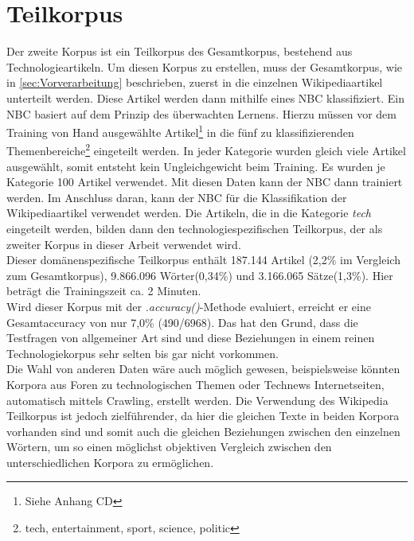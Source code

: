 \documentclass[12pt,a4paper]{report}
\begin{document}
	\section{Teilkorpus}
	\label{sec:Teilkorpus}	
	Der zweite Korpus ist ein Teilkorpus des Gesamtkorpus, bestehend aus Technologieartikeln. Um diesen Korpus zu erstellen, muss der Gesamtkorpus, wie in \ref{sec:Vorverarbeitung} beschrieben, zuerst in die einzelnen Wikipediaartikel unterteilt werden. Diese Artikel werden dann mithilfe eines NBC klassifiziert. Ein NBC basiert auf dem Prinzip des überwachten Lernens. Hierzu müssen vor dem Training von Hand ausgewählte Artikel\footnote{Siehe Anhang CD} in die fünf zu klassifizierenden Themenbereiche\footnote{tech, entertainment, sport, science, politic} eingeteilt werden. In jeder Kategorie wurden gleich viele Artikel ausgewählt, somit entsteht kein Ungleichgewicht beim Training. Es wurden je Kategorie 100 Artikel verwendet. Mit diesen Daten kann der NBC dann trainiert werden. Im Anschluss daran, kann der NBC für die Klassifikation der Wikipediaartikel verwendet werden. Die Artikeln, die in die Kategorie \textit{tech} eingeteilt werden, bilden dann den technologiespezifischen Teilkorpus, der als zweiter Korpus in dieser Arbeit verwendet wird.\\
	
	
	Dieser domänenspezifische Teilkorpus enthält 187.144 Artikel (2,2\% im Vergleich zum Gesamtkorpus), 9.866.096 Wörter(0,34\%) und 3.166.065 Sätze(1,3\%). Hier beträgt die Trainingszeit ca. 2 Minuten.\\
	Wird dieser Korpus mit der \textit{.accuracy()}-Methode evaluiert, erreicht er eine Gesamtaccuracy von nur 7,0\% (490/6968). Das hat den Grund, dass die Testfragen von allgemeiner Art sind und diese Beziehungen in einem reinen Technologiekorpus sehr selten bis gar nicht vorkommen.\\
	

	Die Wahl von anderen Daten wäre auch möglich gewesen, beispielsweise könnten Korpora aus Foren zu technologischen Themen oder Technews Internetseiten, automatisch mittels Crawling, erstellt werden. Die Verwendung des Wikipedia Teilkorpus ist jedoch zielführender, da hier die gleichen Texte in beiden Korpora vorhanden sind und somit auch die gleichen Beziehungen zwischen den einzelnen Wörtern, um so einen möglichst objektiven Vergleich zwischen den unterschiedlichen Korpora zu ermöglichen.\\
	
	
\end{document}
